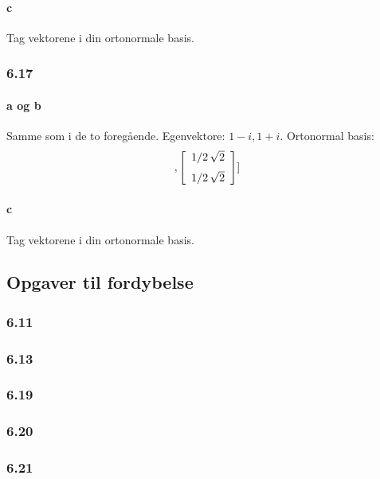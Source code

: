 			\paragraph{c} Tag vektorene i din ortonormale basis.

		\subsubsection{6.17}

			\paragraph{a og b} Samme som i de to foregående. Egenvektore: $1-i, 1+i$. Ortonormal basis:
				\begin{align*} %
					[ \left[ \begin {array}{c} -1/2\,\sqrt {2}\\ \noalign{\medskip}1/2\,
\sqrt {2}\end {array} \right] , \left[ \begin {array}{c} 1/2\,\sqrt {2
}\\ \noalign{\medskip}1/2\,\sqrt {2}\end {array} \right] ]
				\end{align*} 

			\paragraph{c} Tag vektorene i din ortonormale basis.

	\subsection{Opgaver til fordybelse}

		\subsubsection{6.11}

		\subsubsection{6.13}

		\subsubsection{6.19}

		\subsubsection{6.20}

		\subsubsection{6.21}		
